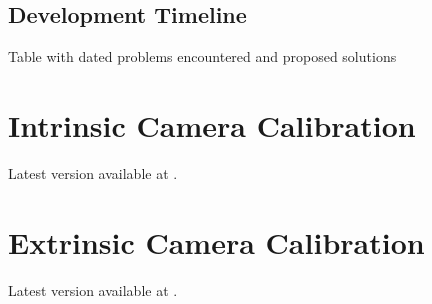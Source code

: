 \documentclass[11pt]{article}
\begin{document}
    \subsection{Development Timeline}
        Table with dated problems encountered and proposed solutions
        
\printbibliography
    
\clearpage    
\appendix
\appendixpage


\section{Intrinsic Camera Calibration}
Latest version available at \cite{intCalibration}.


\section{Extrinsic Camera Calibration}
Latest version available at \cite{extCalibration}.

\end{document}
